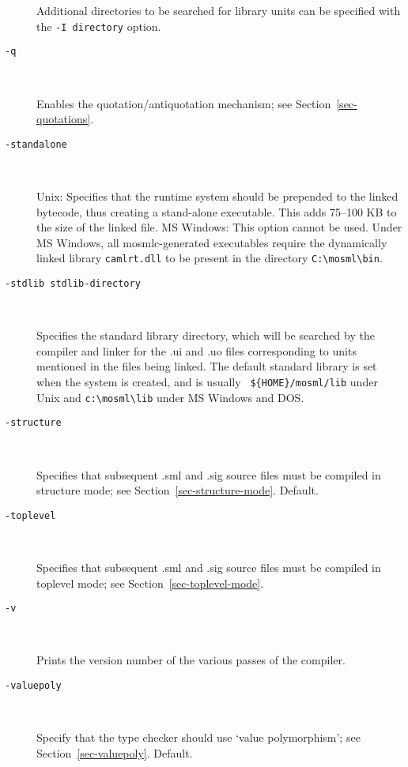 \documentclass[fleqn,a4paper]{article}
\begin{document}
\begin{description}
  Additional directories to be searched for library units can be
  specified with the {\tt -I {\rm directory}} option.

\item[{\tt -q}]\mbox{ }

  Enables the quotation/antiquotation mechanism; see
  Section~\ref{sec-quotations}.

\item[{\tt -standalone}]\mbox{ }
  
  Unix: Specifies that the runtime system should be prepended to the
  linked bytecode, thus creating a stand-alone executable.  This adds
  75--100 KB to the size of the linked file.  MS Windows: This option
  cannot be used.  Under MS Windows, all mosmlc-generated executables
  require the dynamically linked library \texttt{camlrt.dll} to be
  present in the directory \verb+C:\mosml\bin+.

\item[{\tt -stdlib {\rm stdlib-directory}}]\mbox{ }

  Specifies the standard library directory, which will be searched by
  the compiler and linker for the .ui and .uo files corresponding to
  units mentioned in the files being linked.  The default standard
  library is set when the system is created, and is usually {\tt
    \$\{HOME\}/mosml/lib} under Unix and \verb#c:\mosml\lib# under MS
  Windows and DOS.

\item[{\tt -structure}]\mbox{ }
  
  Specifies that subsequent .sml and .sig source files must be
  compiled in structure mode; see Section~\ref{sec-structure-mode}.
  Default.

\item[{\tt -toplevel}]\mbox{ }
  
  Specifies that subsequent .sml and .sig source files must be
  compiled in toplevel mode; see Section~\ref{sec-toplevel-mode}.

\item[{\tt -v}]\mbox{ }
  
  Prints the version number of the various passes of the compiler.

\item[{\tt -valuepoly}]\mbox{ }

  Specify that the type checker should use `value polymorphism'; see
  Section~\ref{sec-valuepoly}.  Default.
\end{description}
\end{document}
